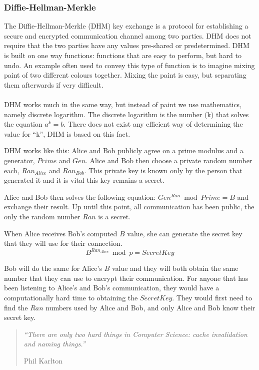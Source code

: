 \subsubsection{Diffie-Hellman-Merkle}
\label{sec:dhm}
The Diffie-Hellman-Merkle (DHM) key exchange \cite{diffie1976new} is a protocol for establishing a secure and encrypted communication channel among two parties. DHM does not require that the two parties have any values pre-shared or predetermined. DHM is built on one way functions: functions that are easy to perform, but hard to undo. An example often used to convey this type of function is to imagine mixing paint of two different colours together. Mixing the paint is easy, but separating them afterwards if very difficult.
\\\\
DHM works much in the same way, but instead of paint we use mathematics, namely discrete logarithm. The discrete logarithm is the number (k) that solves the equation $ a^k = b $. There does not exist any efficient way of determining the value for ``k'', DHM is based on this fact.

DHM works like this: Alice and Bob publicly agree on a prime modulus and a generator, $Prime$ and $Gen$. Alice and Bob then choose a private random number each, ${Ran_{Alice}}$ and ${Ran_{Bob}}$. This private key is known only by the person that generated it and it is vital this key remains a secret.

Alice and Bob then solves the following equation: $Gen^{Ran} \bmod Prime = B$ and exchange their result. Up until this point, all communication has been public, the only the random number $Ran$ is a secret.

When Alice receives Bob's computed $B$ value, she can generate the secret key that they will use for their connection.
$$
  B^{Ran_{Alice}} \bmod p = SecretKey
$$

Bob will do the same for Alice's $B$ value and they will both obtain the same number that they can use to encrypt their communication. For anyone that has been listening to Alice's and Bob's communication,  they would have a computationally hard time to obtaining the $SecretKey$. They would first need to find the $Ran$ numbers used by Alice and Bob, and only Alice and Bob know their secret key.

\begin{quote}
	\textit{``There are only two hard things in Computer Science: cache invalidation and naming things.''}
	\begin{flushright}
		Phil Karlton
	\end{flushright}
\end{quote}

